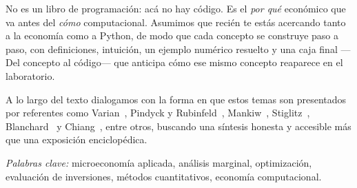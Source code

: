 \documentclass[11pt,a4paper,oneside]{report}
\theoremstyle{definition}
\begin{document}
No es un libro de programación: acá no hay código. Es el \emph{por qué} económico que va antes del \emph{cómo} computacional. Asumimos que recién te estás acercando tanto a la economía como a Python, de modo que cada concepto se construye paso a paso, con definiciones, intuición, un ejemplo numérico resuelto y una caja final —\textsf{Del concepto al código}— que anticipa cómo ese mismo concepto reaparece en el laboratorio.

A lo largo del texto dialogamos con la forma en que estos temas son presentados por referentes como Varian~\cite{varian}, Pindyck y Rubinfeld~\cite{pindyck}, Mankiw~\cite{mankiw}, Stiglitz~\cite{stiglitz}, Blanchard~\cite{blanchard} y Chiang~\cite{chiang}, entre otros, buscando una síntesis honesta y accesible más que una exposición enciclopédica.

\bigskip
\noindent\textit{Palabras clave:} microeconomía aplicada, análisis marginal, optimización, evaluación de inversiones, métodos cuantitativos, economía computacional.

\vspace{1cm}
\tableofcontents
\thispagestyle{plain}














\appendix


\end{document}
